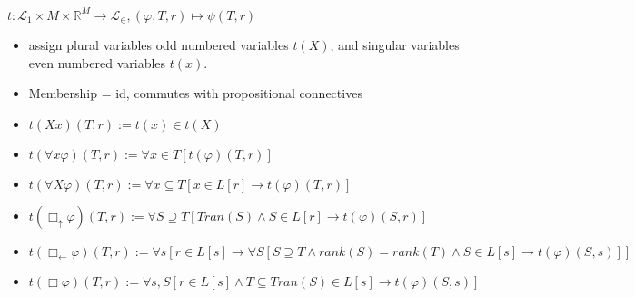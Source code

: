 \documentclass{article}
\theoremstyle{definition}
\newcommand{\bu}{\Box_\uparrow}
\newcommand{\bl}{\Box_\leftarrow}
\begin{document}
$t : \mathcal{L}_1 \times M \times \mathbb{R}^M \to \mathcal{L}_\in, (\varphi, T, r) \mapsto \psi(T, r)$
\begin{itemize}
    \item assign plural variables odd numbered variables $t(X)$, and singular variables even 
            numbered variables $t(x)$.
    \item Membership = id, commutes with propositional connectives 
    \item $t(Xx)(T, r) := t(x) \in t(X)$
    \item $t(\forall x \varphi)(T, r) := \forall x \in T [t(\varphi)(T, r)]$
    \item $t(\forall X \varphi)(T, r) := \forall x \subseteq T [x \in L[r] \rightarrow t(\varphi)(T, r)]$
    \item $t(\bu \varphi)(T, r) := \forall S \supseteq T [Tran(S) \wedge S \in L[r] \rightarrow t(\varphi)(S, r)]$
    \item $t(\bl \varphi)(T, r) := \forall s[ r \in L[s] \rightarrow \forall S[ S \supseteq T \wedge rank(S) = rank(T) \wedge S \in L[s] \rightarrow t(\varphi)(S, s)]]$
    \item $t(\Box \varphi)(T, r) := \forall s, S[r \in L[s] \wedge T \subseteq Tran(S) \in L[s]  \rightarrow t(\varphi)(S, s) ]$
\end{itemize}
\end{document}
